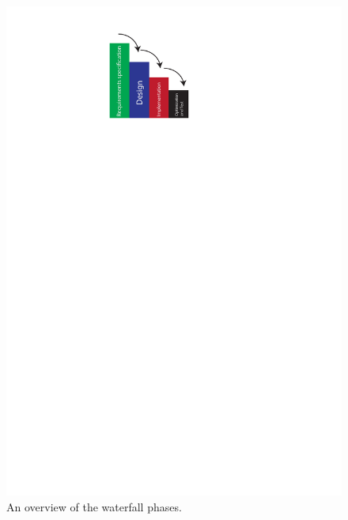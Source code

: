 \begin{figure}[h]
\centering
\includegraphics[scale=0.6]{Figures/Waterfall}
\caption{An overview of the waterfall phases.}
\label{fig:Waterfall}
\end{figure}
\newpage

